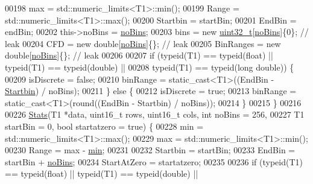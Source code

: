 \begin{DoxyCode}
00198     max = std::numeric\_limits<T1>::min();
00199     Range = std::numeric\_limits<T1>::max();
00200     Startbin = startBin;
00201     EndBin = endBin;
00202     this->noBins = \hyperlink{class_soil_math_1_1_stats_a4202c9085eacaff2e04eda84fc90e92b}{noBins};
00203     bins = \textcolor{keyword}{new} \hyperlink{_soil_math_types_8h_a435d1572bf3f880d55459d9805097f62}{uint32\_t}[\hyperlink{class_soil_math_1_1_stats_a4202c9085eacaff2e04eda84fc90e92b}{noBins}]\{0\};   \textcolor{comment}{// leak}
00204     CFD = \textcolor{keyword}{new} \textcolor{keywordtype}{double}[\hyperlink{class_soil_math_1_1_stats_a4202c9085eacaff2e04eda84fc90e92b}{noBins}]\{\};       \textcolor{comment}{// leak}
00205     BinRanges = \textcolor{keyword}{new} \textcolor{keywordtype}{double}[\hyperlink{class_soil_math_1_1_stats_a4202c9085eacaff2e04eda84fc90e92b}{noBins}]\{\}; \textcolor{comment}{// leak}
00206 
00207     \textcolor{keywordflow}{if} (\textcolor{keyword}{typeid}(T1) == \textcolor{keyword}{typeid}(\textcolor{keywordtype}{float}) || \textcolor{keyword}{typeid}(T1) == \textcolor{keyword}{typeid}(\textcolor{keywordtype}{double}) ||
00208         \textcolor{keyword}{typeid}(T1) == \textcolor{keyword}{typeid}(\textcolor{keywordtype}{long} \textcolor{keywordtype}{double})) \{
00209       isDiscrete = \textcolor{keyword}{false};
00210       binRange = \textcolor{keyword}{static\_cast<}T1\textcolor{keyword}{>}((EndBin - \hyperlink{class_soil_math_1_1_stats_acf54f4a105482109ebc884c8e56d0ba9}{Startbin}) / noBins);
00211     \} \textcolor{keywordflow}{else} \{
00212       isDiscrete = \textcolor{keyword}{true};
00213       binRange = \textcolor{keyword}{static\_cast<}T1\textcolor{keyword}{>}(round((EndBin - Startbin) / noBins));
00214     \}
00215   \}
00216 
00226   \hyperlink{class_soil_math_1_1_stats_aa9727b7ea39b46f8a010a7b710b26d83}{Stats}(T1 *data, uint16\_t rows, uint16\_t cols, \textcolor{keywordtype}{int} noBins = 256,
00227         T1 startBin = 0, \textcolor{keywordtype}{bool} startatzero = \textcolor{keyword}{true}) \{
00228     min = std::numeric\_limits<T1>::max();
00229     max = std::numeric\_limits<T1>::min();
00230     Range = max - \hyperlink{class_soil_math_1_1_stats_aa44c07a23b1c2ce0f0407e7cee4f39a9}{min};
00231 
00232     Startbin = startBin;
00233     EndBin = startBin + \hyperlink{class_soil_math_1_1_stats_a4202c9085eacaff2e04eda84fc90e92b}{noBins};
00234     StartAtZero = startatzero;
00235 
00236     \textcolor{keywordflow}{if} (\textcolor{keyword}{typeid}(T1) == \textcolor{keyword}{typeid}(\textcolor{keywordtype}{float}) || \textcolor{keyword}{typeid}(T1) == \textcolor{keyword}{typeid}(\textcolor{keywordtype}{double}) ||

\end{DoxyCode}
